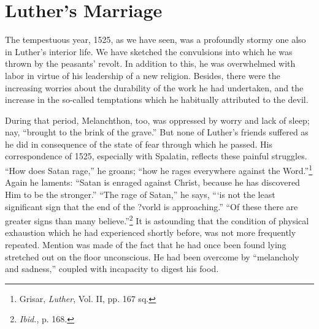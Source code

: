 \section{Luther’s Marriage}

The tempestuous year, 1525, as we have seen, was a profoundly
stormy one also in Luther’s interior life. We have sketched the convulsions
into which he was thrown by the peasants’ revolt. In addition to this,
he was overwhelmed with labor in virtue of his leadership of a new religion.
Besides, there were the increasing worries
about the durability of the work he had undertaken, and the increase
in the so-called temptations which he habitually attributed to the
devil.

During that period, Melanchthon, too, was oppressed by worry
and lack of sleep; nay, “brought to the brink of the grave.” But
none of Luther’s friends suffered as he did in consequence of the
state of fear through which he passed. His correspondence of 1525,
especially with Spalatin, reflects these painful struggles. “How does
Satan rage,” he groans; “how he rages everywhere against the
Word.”\footnote{Grisar, \textit{Luther}, Vol. II, pp. 167 sq.}
Again he laments: “Satan is enraged against Christ, because
he has discovered Him to be the stronger.” “The rage of Satan,”
he says, “‘is not the least significant sign that the end of the ?vorld is
approaching.” “Of these there are greater signs than many believe.”\footnote{\textit{Ibid.}, p. 168.}
It is astounding that the condition of physical exhaustion which he
had experienced shortly before, was not more frequently repeated.
Mention was made of the fact that he had once been found lying
stretched out on the floor unconscious. He had been overcome by
“melancholy and sadness,” coupled with incapacity to digest his food.


